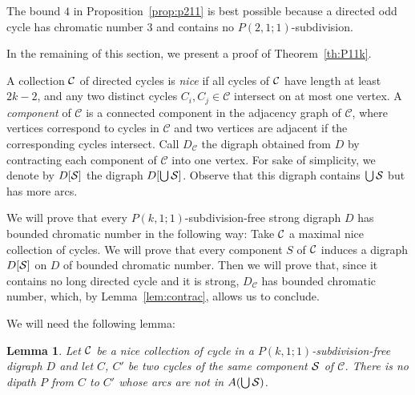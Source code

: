 \documentclass[utf8,10pt]{article}
\theoremstyle{plain}
\newtheorem{lemma}[theorem]{Lemma}
\theoremstyle{definition}
\theoremstyle{remark}
\begin{document}
The bound $4$ in Proposition~\ref{prop:p211} is best possible because a directed odd cycle has chromatic number $3$ and contains no $P(2,1;1)$-subdivision.


\medskip

In the remaining of this section, we present a proof of Theorem~\ref{th:P11k}.

A collection ${\cal C}$ of directed cycles is {\it nice} if all cycles of ${\cal C}$ have length at least $2k-2$, and
any two distinct cycles $C_i,C_j\in\mathcal C$ intersect on at most one vertex. %
A {\it component} of $\mathcal{C}$ is a connected component in the adjacency graph of $\mathcal{C}$, where vertices correspond to cycles in $\mathcal{C}$
and two vertices are adjacent if the corresponding cycles intersect. 
Call $D_{\mathcal{C}}$ the digraph obtained from $D$ by contracting each component of $\mathcal{C}$ into one vertex. 
For sake of simplicity, we denote by $D[{\cal S}]$ the digraph $D[\bigcup {\cal S}]$. Observe that this digraph contains $\bigcup {\cal S}$ but has more arcs.


We will prove that every $P(k,1;1)$-subdivision-free strong digraph $D$ has bounded chromatic number in the following way:
Take ${\cal C}$ a maximal nice collection of cycles. 
We will prove that every component $S$ of ${\cal C}$ induces a digraph $D[{\cal S}]$ on $D$ of bounded chromatic number. 
Then we will prove that, since it contains no long directed cycle and it is strong, $D_{\mathcal{C}}$ has bounded chromatic number,
which, by Lemma~\ref{lem:contrac}, allows us to conclude. 

We will need the following lemma:



\begin{lemma}\label{lem:headphone}
Let ${\cal C}$ be a nice collection of cycle in a $P(k,1;1)$-subdivision-free digraph $D$ and let $C$, $C'$ be two cycles of the same
component ${\cal S}$ of $\mathcal{C}$. There is no dipath $P$ from $C$ to $C'$ whose arcs are not in $A (\bigcup  {\cal S})$. 
\end{lemma}
\end{document}
